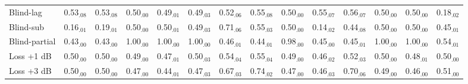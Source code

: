 \begin{tabular}{lccccccccccccc}
Blind-lag & 0.53$_{.08}$ & 0.53$_{.08}$ & 0.50$_{.00}$ & 0.49$_{.01}$ & 0.49$_{.03}$ & 0.52$_{.06}$ & 0.55$_{.08}$ & 0.50$_{.00}$ & 0.55$_{.07}$ & 0.56$_{.07}$ & 0.50$_{.00}$ & 0.50$_{.00}$ & 0.18$_{.02}$\\
Blind-sub & 0.16$_{.01}$ & 0.19$_{.01}$ & 0.50$_{.00}$ & 0.50$_{.01}$ & 0.49$_{.03}$ & 0.71$_{.06}$ & 0.55$_{.03}$ & 0.50$_{.00}$ & 0.14$_{.02}$ & 0.44$_{.08}$ & 0.50$_{.00}$ & 0.50$_{.00}$ & 0.45$_{.01}$\\
Blind-partial & 0.43$_{.00}$ & 0.43$_{.00}$ & 1.00$_{.00}$ & 1.00$_{.00}$ & 1.00$_{.00}$ & 0.46$_{.01}$ & 0.44$_{.01}$ & 0.98$_{.00}$ & 0.45$_{.00}$ & 0.45$_{.01}$ & 1.00$_{.00}$ & 1.00$_{.00}$ & 0.54$_{.01}$\\
Loss +1 dB & 0.50$_{.00}$ & 0.50$_{.00}$ & 0.49$_{.00}$ & 0.47$_{.01}$ & 0.50$_{.03}$ & 0.54$_{.04}$ & 0.55$_{.04}$ & 0.49$_{.00}$ & 0.46$_{.02}$ & 0.52$_{.03}$ & 0.50$_{.00}$ & 0.48$_{.01}$ & 0.50$_{.00}$\\
Loss +3 dB & 0.50$_{.00}$ & 0.50$_{.00}$ & 0.47$_{.00}$ & 0.44$_{.01}$ & 0.47$_{.03}$ & 0.67$_{.03}$ & 0.74$_{.02}$ & 0.47$_{.00}$ & 0.46$_{.03}$ & 0.70$_{.06}$ & 0.49$_{.00}$ & 0.46$_{.00}$ & 0.51$_{.00}$\\
\hline
\end{tabular}